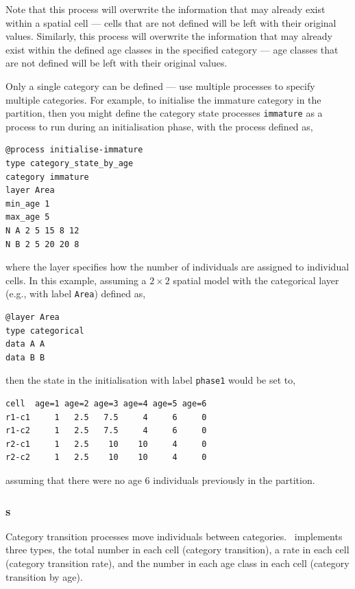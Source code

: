 Note that this process will overwrite the information that may already exist within a spatial cell --- cells that are not defined will be left with their original values. Similarly, this process will overwrite the information that may already exist within the defined age classes in the specified category --- age classes that are not defined will be left with their original values. 

Only a single category can be defined --- use multiple processes to specify multiple categories. For example, to initialise the immature category in the partition, then you might define the category state processes \texttt{immature} as a process to run during an initialisation phase, with the process defined as,
{\small{\begin{verbatim}
@process initialise-immature
type category_state_by_age
category immature
layer Area
min_age 1
max_age 5
N A 2 5 15 8 12
N B 2 5 20 20 8
\end{verbatim}}}

where the layer specifies how the number of individuals are assigned to individual cells. In this example, assuming a $2 \times 2$ spatial model with the categorical layer (e.g., with label \texttt{Area}) defined as,
{\small{\begin{verbatim}
@layer Area
type categorical
data A A 
data B B
\end{verbatim}}}

then the state in the initialisation with label \texttt{phase1} would be set to,
{\small{\begin{verbatim}
cell  age=1 age=2 age=3 age=4 age=5 age=6
r1-c1     1   2.5   7.5     4     6     0
r1-c2     1   2.5   7.5     4     6     0
r2-c1     1   2.5    10    10     4     0
r2-c2     1   2.5    10    10     4     0 
\end{verbatim}}}

assuming that there were no age $6$ individuals previously in the partition. 

\subsubsection{s}

Category transition processes move individuals between categories. \SPM\ implements three types, the total number in each cell (category transition), a rate in each cell (category transition rate), and the number in each age class in each cell (category transition by age).

\subsubsection*{}

